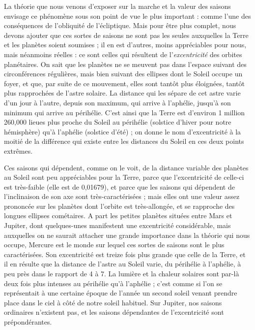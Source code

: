 \documentclass[a4paper, 11pt, oneside]{article}
\begin{document}
La théorie que nous venons d'exposer sur la marche et la valeur des saisons envisage ce phénomène sous son point de vue le plus important : comme l'une des conséquences de l'obliquité de l'écliptique. Mais pour être plus complet, nous devons ajouter que ces sortes de saisons ne sont pas les seules auxquelles la Terre et les planètes soient soumises ; il en est d'autres, moins appréciables pour nous, mais néanmoins réelles : ce sont celles qui résultent de l'\emph{excentricité} des orbites planétaires. On sait que les planètes ne se meuvent pas dans l'espace suivant des circonférences régulières, mais bien suivant des ellipses dont le Soleil occupe un foyer, et que, par suite de ce mouvement, elles sont tantôt plus éloignées, tantôt plus rapprochées de l'astre solaire. La distance qui les sépare de cet astre varie d'un jour à l'autre, depuis son maximum, qui arrive à l'aphélie, jusqu'à son minimum qui arrive au périhélie. C'est ainsi que la Terre est d'environ 1 million 260,000 lieues plus proche du Soleil au périhélie (solstice d'hiver pour notre hémisphère) qu'à l'aphélie (solstice d'été) ; on donne le nom d'excentricité à la moitié de la différence qui existe entre les distances du Soleil en ces deux points extrêmes.

Ces saisons qui dépendent, comme on le voit, de la distance variable des planètes au Soleil sont peu appréciables pour la Terre, parce que l'excentricité de celle-ci est très-faible (elle est de 0,01679), et parce que les saisons qui dépendent de l'inclinaison de son axe sont très-caractérisées ; mais elles ont une valeur assez prononcée sur les planètes dont l'orbite est très-allongée, et se rapproche des longues ellipses cométaires. A part les petites planètes situées entre Mars et Jupiter, dont quelques-unes manifestent une excentricité considérable, mais auxquelles on ne saurait attacher une grande importance dans la théorie qui nous occupe, Mercure est le monde sur lequel ces sortes de saisons sont le plus caractérisées. Son excentricité est treize fois plus grande que celle de la Terre, et il en résulte que la distance de l'astre au Soleil varie, du périhélie à l'aphélie, à peu près dans le rapport de 4 à 7. La lumière et la chaleur solaires sont par-là deux fois plus intenses au périhélie qu'à l'aphélie ; c'est comme si l'on se représentait à une certaine époque de l'année un second soleil venant prendre place dans le ciel à côté de notre soleil habituel. Sur Jupiter, nos saisons ordinaires n'existent pas, et les saisons dépendantes de l'excentricité sont prépondérantes.
\end{document}
